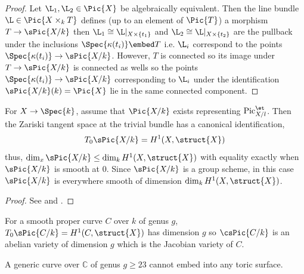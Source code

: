 \begin{proof}
Let $\L_1, \L_2 \in \Pic{X}$ be algebraically equivalent. Then the line bundle $\L \in \Pic{X \times_k T}$ defines (up to an element of $\Pic{T}$) a morphism $T \to \sPic{X/k}$ then $\L_1 \cong \L |_{X \times \{t_1\}}$ and $\L_2 \cong \L |_{X \times \{ t_2 \}}$ are the pullback under the inclusions $\Spec{\kappa(t_i)} \embed T$ i.e. $\L_i$ correspond to the points $\Spec{\kappa(t_i)} \to \sPic{X/k}$. However, $T$ is connected so its image under $T \to \sPic{X/k}$ is connected as wells so the points $\Spec{\kappa(t_i)} \to \sPic{X/k}$ corresponding to $\L_i$ under the identification $\sPic{X/k}(k) = \Pic{X}$ lie in the same connected component.
\end{proof}

\begin{theorem}
For $X \to \Spec{k}$, assume that $\Pic{X/k}$ exists representing $\mathrm{Pic}_{X/l}^{\et}$. Then the Zariski tangent space at the trivial bundle has a canonical identification,
\[ T_0 \sPic{X/k} = H^1(X, \struct{X}) \]
thus, $\dim_{x}{\sPic{X/k}} \le \dim_k H^1(X, \struct{X})$ with equality exactly when $\sPic{X/k}$ is smooth at $0$. Since $\sPic{X/k}$ is a group scheme, in  this case $\sPic{X/k}$ is everywhere smooth of dimension $\dim_k H^1(X, \struct{X})$.
\end{theorem}

\begin{proof}
See \cite[Thm. 5.11]{FGA_explained} and \cite[Cor. 5.13]{FGA_explained}.
\end{proof}

\begin{rmk}
For a smooth proper curve $C$ over $k$ of genus $g$, $T_0 \sPic{C/k} = H^1(C, \struct{X})$ has dimension $g$ so $\csPic{C/k}$ is an abelian variety of dimension $g$ which is the Jacobian variety of $C$. 
\end{rmk}

\begin{theorem}
A generic curve over $\mathbb{C}$ of genus $g \ge 23$ cannot embed into any toric surface. 
\end{theorem}

